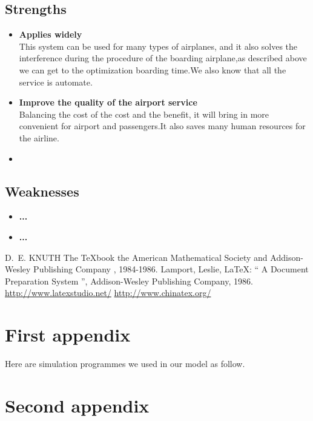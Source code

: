 \documentclass{mcmthesis}
\begin{document}
\subsection{Strengths}
\begin{itemize}
\item \textbf{Applies widely}\\
This  system can be used for many types of airplanes, and it also
solves the interference during  the procedure of the boarding
airplane,as described above we can get to the  optimization
boarding time.We also know that all the service is automate.
\item \textbf{Improve the quality of the airport service}\\
Balancing the cost of the cost and the benefit, it will bring in
more convenient  for airport and passengers.It also saves many
human resources for the airline. \item \textbf{}
\end{itemize}
\subsection{Weaknesses}
\begin{itemize}
  \item \textbf{...}
  \item \textbf{...}
\end{itemize}


\begin{thebibliography}{99}
 D.~E. KNUTH   The \TeX{}book  the American
Mathematical Society and Addison-Wesley
Publishing Company , 1984-1986.
Lamport, Leslie,  \LaTeX{}: `` A Document Preparation System '',
Addison-Wesley Publishing Company, 1986.
\url{http://www.latexstudio.net/}
\url{http://www.chinatex.org/}
\end{thebibliography}

\begin{appendices}

\section{First appendix}

Here are simulation programmes we used in our model as follow.\\

% 

\section{Second appendix}

% 

\end{appendices}
\end{document}
